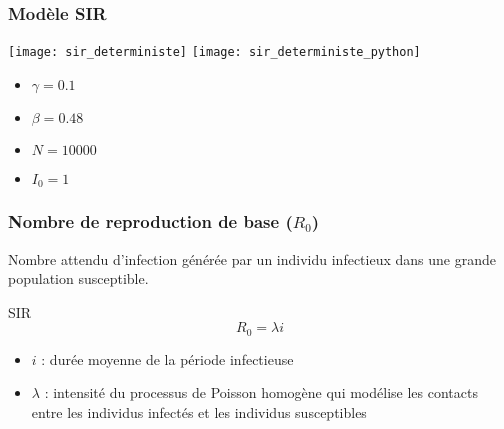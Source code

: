 \begin{frame}
        \frametitle{Modèle SIR}

		\centering

		\texttt{[image: sir\_deterministe]}
		\texttt{[image: sir\_deterministe\_python]}
		
        \begin{multicols}{2}
                \begin{itemize}
                        \item $\gamma = 0.1$
                        \item $\beta = 0.48$
                        \item $N = 10000$
                        \item $I_0 = 1$
                \end{itemize}
        \end{multicols}

\end{frame}

\begin{frame}
        \frametitle{Nombre de reproduction de base ($R_0$)}

        Nombre attendu d’infection générée par un individu infectieux dans une grande population susceptible.

        \begin{alertblock}{SIR}
                $$ R_0 =  \lambda i $$
        \end{alertblock}

        \begin{itemize}
                \item $i$ : durée moyenne de la période infectieuse
                \item $\lambda$ : intensité du processus de Poisson homogène qui modélise les contacts entre les individus infectés et les individus susceptibles
        \end{itemize}
\end{frame}
